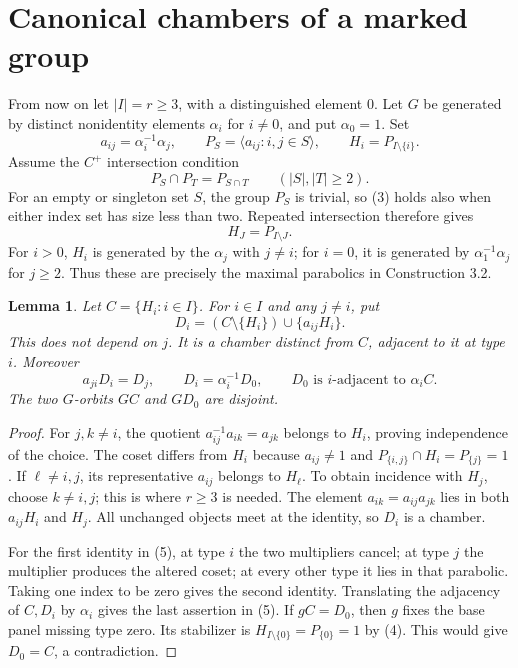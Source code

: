 \documentclass[11pt]{article}
\newtheorem{lemma}[theorem]{Lemma}
\newcommand{\gen}[1]{\langle #1\rangle}
\begin{document}
\section{Canonical chambers of a marked group}
From now on let $|I|=r\geq3$, with a distinguished element $0$.
Let $G$ be generated by distinct nonidentity elements $\alpha_i$
for $i\ne0$, and put $\alpha_0=1$. Set
\[
 a_{ij}=\alpha_i^{-1}\alpha_j,\qquad
 P_S=\gen{a_{ij}:i,j\in S},\qquad H_i=P_{I\setminus\{i\}}.
\]
Assume the $C^+$ intersection condition
\[
 P_S\cap P_T=P_{S\cap T}\qquad(|S|,|T|\geq2).             \tag{3}
\]
For an empty or singleton set $S$, the group $P_S$ is trivial, so
(3) holds also when either index set has size less than two.
Repeated intersection therefore gives
\[
                  H_J=P_{I\setminus J}.                  \tag{4}
\]
For $i>0$, $H_i$ is generated by the $\alpha_j$ with $j\ne i$;
for $i=0$, it is generated by $\alpha_1^{-1}\alpha_j$ for $j\geq2$.
Thus these are precisely the maximal parabolics in Construction 3.2.

\begin{lemma}\label{neighbours}
Let $C=\{H_i:i\in I\}$. For $i\in I$ and any $j\ne i$, put
\[
 D_i=(C\setminus\{H_i\})\cup\{a_{ij}H_i\}.
\]
This does not depend on $j$. It is a chamber distinct from $C$,
adjacent to it at type $i$. Moreover
\[
 a_{ji}D_i=D_j,\qquad D_i=\alpha_i^{-1}D_0,
 \qquad D_0\text{ is $i$-adjacent to }\alpha_i C.          \tag{5}
\]
The two $G$-orbits $GC$ and $GD_0$ are disjoint.
\end{lemma}
\begin{proof}
For $j,k\ne i$, the quotient $a_{ij}^{-1}a_{ik}=a_{jk}$ belongs
to $H_i$, proving independence of the choice. The coset differs
from $H_i$ because $a_{ij}\ne1$ and
$P_{\{i,j\}}\cap H_i=P_{\{j\}}=1$.
If $\ell\ne i,j$, its representative $a_{ij}$ belongs to $H_\ell$.
To obtain incidence with $H_j$, choose $k\ne i,j$; this is where
$r\geq3$ is needed. The element $a_{ik}=a_{ij}a_{jk}$ lies in both
$a_{ij}H_i$ and $H_j$. All unchanged objects meet at the identity,
so $D_i$ is a chamber.

For the first identity in (5), at type $i$ the two multipliers
cancel; at type $j$ the multiplier produces the altered coset;
at every other type it lies in that parabolic. Taking one index
to be zero gives the second identity. Translating the adjacency
of $C,D_i$ by $\alpha_i$ gives the last assertion in (5).
If $gC=D_0$, then $g$ fixes the base panel missing type zero.
Its stabilizer is $H_{I\setminus\{0\}}=P_{\{0\}}=1$ by (4).
This would give $D_0=C$, a contradiction.
\end{proof}
\end{document}
